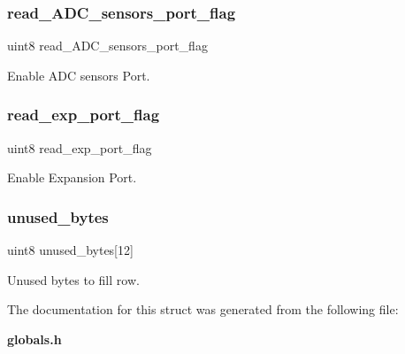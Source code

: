 \subsubsection{read\+\_\+\+A\+D\+C\+\_\+sensors\+\_\+port\+\_\+flag}
{\footnotesize\ttfamily uint8 read\+\_\+\+A\+D\+C\+\_\+sensors\+\_\+port\+\_\+flag}

Enable A\+DC sensors Port. \mbox{\label{structst__expansion_aa0fa0bc36fe5fc720d757680e189f6d2}} 
\subsubsection{read\+\_\+exp\+\_\+port\+\_\+flag}
{\footnotesize\ttfamily uint8 read\+\_\+exp\+\_\+port\+\_\+flag}

Enable Expansion Port. \mbox{\label{structst__expansion_a8ba5c3bbdccc2457552b555caf55c1be}} 
\subsubsection{unused\+\_\+bytes}
{\footnotesize\ttfamily uint8 unused\+\_\+bytes[12]}

Unused bytes to fill row. 

The documentation for this struct was generated from the following file\+:\begin{DoxyCompactItemize}
\item 
\textbf{ globals.\+h}\end{DoxyCompactItemize}
